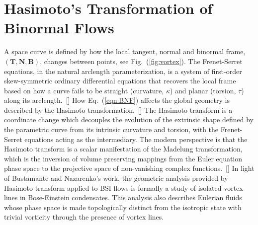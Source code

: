 \documentclass[aps,graphicx,reprint,onecolumn,12pt,tightenlines,longbibliography]{revtex4-1}
\begin{document}
\section{\label{sec:Hasimoto transform} Hasimoto's Transformation of Binormal Flows}
%
A space curve is defined by how the local tangent, normal and binormal frame, $(\textbf{T},\textbf{N},\textbf{B})$, changes between points, see Fig.~(\ref{fig:vortex}). The Frenet-Serret equations, in the natural arclength parameterization, is a system of first-order skew-symmetric ordinary differential equations that recovers the local frame based on how a curve fails to be straight (curvature, $\kappa$) and planar (torsion, $\tau$) along its arclength.~[]
How Eq.~(\ref{eqn:BNF}) affects the global geometry is described by the Hasimoto transformation.~[] The Hasimoto transform is a coordinate change which decouples the evolution of the extrinsic shape defined by the parametric curve from its intrinsic curvature and torsion, with the Frenet-Serret equations acting as the intermediary. The modern perspective is that the Hasimoto transform is a scalar manifestation of the Madelung transformation, which is the inversion of volume preserving mappings from the Euler equation phase space to the projective space of non-vanishing complex functions.~[] In light of Bustamante and Nazarenko's work, the geometric analysis provided by Hasimoto transform applied to BSI flows is formally a study of isolated vortex lines in Bose-Einstein condensates. This analysis also describes Eulerian fluids whose phase space is made topologically distinct from the isotropic state with trivial vorticity through the presence of vortex lines.
\end{document}
